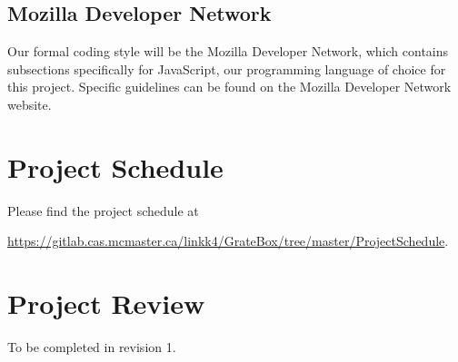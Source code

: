 \documentclass{article}
\begin{document}
\subsection{Mozilla Developer Network}

Our formal coding style will be the Mozilla Developer Network, which contains 
subsections specifically for JavaScript, our programming language of choice for 
this project. Specific guidelines can be found on the Mozilla Developer Network 
website.

\section{Project Schedule}
Please find the project schedule at 

\href{https://gitlab.cas.mcmaster.ca/linkk4/GrateBox/tree/master/ProjectSchedule} 
{https://gitlab.cas.mcmaster.ca/linkk4/GrateBox/tree/master/ProjectSchedule}.

\section{Project Review}
To be completed in revision 1.
\end{document}
